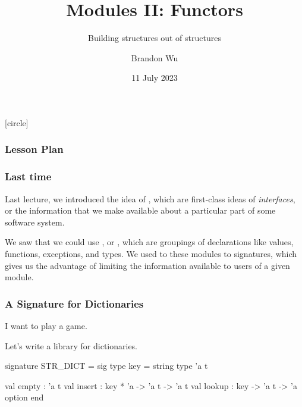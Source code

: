 \documentclass[aspectratio=169, handout]{beamer}
\title{Modules II: Functors} %
\subtitle{Building structures out of structures} %
\date{11 July 2023} %
\author{Brandon Wu} %
\newif\ifcolorlambda
\begin{document}
\ifweb
    \renewcommand{\pause}{}
\fi

[circle]

{
\begin{frame}[plain]
    \colorlambdatrue
    \titlepage
\end{frame}
}

\begin{frame}[fragile]
  \frametitle{Lesson Plan}

  \tableofcontents
\end{frame}


\begin{frame}[fragile]
  \frametitle{Last time}

  Last lecture, we introduced the idea of , which are first-class
  ideas of \textit{interfaces}, or the information that we make available about a
  particular part of some software system.

  \pause
  \vspace{\fill}

  We saw that we could use , or , which are groupings
  of declarations like values, functions, exceptions, and types. We used
   to  these modules to
  signatures, which gives us the advantage of limiting the information available to
  users of a given module.
\end{frame}


\begin{frame}[fragile]
  \frametitle{A Signature for Dictionaries}

  I want to play a game.

  \pause
  \vspace{\fill}

  Let's write a library for dictionaries.

  \pause
  \vspace{\fill}

  \begin{codeblock}
    signature STR_DICT =
      sig
        type key = string
        type 'a t

        val empty : 'a t
        val insert : key * 'a -> 'a t -> 'a t
        val lookup : key -> 'a t -> 'a option
      end
  \end{codeblock}
\end{frame}
\end{document}
